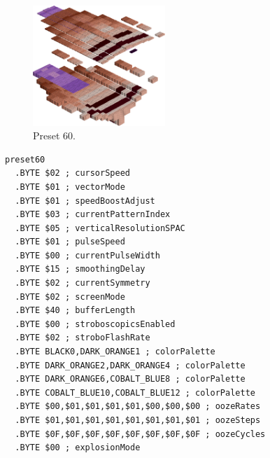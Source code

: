 \clearpage
\begin{minipage}[b]{0.48\linewidth}
\begin{figure}[H]                                                          
  \centering                                                             
  \begin{adjustbox}{width=5cm,center}                                   
  \includegraphics[width=5cm]{src/colorspace_presets/preset60-45.png}%
  \end{adjustbox}                                                        
\caption*{Preset 60.}                                           
\end{figure}                                                               
\end{minipage}
\hspace{0.1cm}
\begin{minipage}[b]{0.48\linewidth}                            
\begin{lstlisting}[basicstyle=\ttfamily\tiny]
preset60
  .BYTE $02 ; cursorSpeed
  .BYTE $01 ; vectorMode
  .BYTE $01 ; speedBoostAdjust
  .BYTE $03 ; currentPatternIndex
  .BYTE $05 ; verticalResolutionSPAC
  .BYTE $01 ; pulseSpeed
  .BYTE $00 ; currentPulseWidth
  .BYTE $15 ; smoothingDelay
  .BYTE $02 ; currentSymmetry
  .BYTE $02 ; screenMode
  .BYTE $40 ; bufferLength
  .BYTE $00 ; stroboscopicsEnabled
  .BYTE $02 ; stroboFlashRate
  .BYTE BLACK0,DARK_ORANGE1 ; colorPalette
  .BYTE DARK_ORANGE2,DARK_ORANGE4 ; colorPalette
  .BYTE DARK_ORANGE6,COBALT_BLUE8 ; colorPalette
  .BYTE COBALT_BLUE10,COBALT_BLUE12 ; colorPalette
  .BYTE $00,$01,$01,$01,$01,$00,$00,$00 ; oozeRates
  .BYTE $01,$01,$01,$01,$01,$01,$01,$01 ; oozeSteps
  .BYTE $0F,$0F,$0F,$0F,$0F,$0F,$0F,$0F ; oozeCycles
  .BYTE $00 ; explosionMode
\end{lstlisting}
\end{minipage}

\vspace*{-0.5cm}

